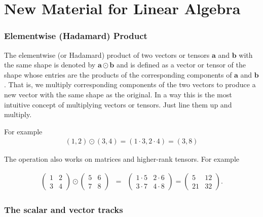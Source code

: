 \chapter{New Material for Linear Algebra}


\subsection{Elementwise (Hadamard) Product}\label{hadamard}

The elementwise (or Hadamard) product of two vectors or tensors $\mathbf{a}$ and $\mathbf{b}$ with the same shape is denoted by $\mathbf{a} \odot \mathbf{b}$ and is defined as a vector or tensor of the shape whose entries are the products of the corresponding components of $\mathbf{a}$  and $\mathbf{b}$. That is, we multiply corresponding components of the two vectors to produce a new vector with the same shape as the original. In a way this is the most intuitive concept of multiplying vectors or tensors. Just line them up and multiply.

For example
\begin{eqnarray}
(1,2) \odot (3,4) = (1 \cdot 3,  2 \cdot 4) =  (3,8)
\end{eqnarray}

The operation also works on matrices and higher-rank tensors. For example

\begin{eqnarray}
\begin{pmatrix} 1 & 2 \\ 3 & 4 \end{pmatrix} \odot \begin{pmatrix} 5 & 6 \\ 7 & 8 \end{pmatrix} &=& \begin{pmatrix} 1 \cdot 5 & 2 \cdot 6 \\ 3 \cdot 7 & 4 \cdot 8 \end{pmatrix} = \begin{pmatrix} 5 & 12 \\ 21 & 32 \end{pmatrix}.
\end{eqnarray}


\subsection{The scalar and vector tracks}\label{scalarVectorTracks}

